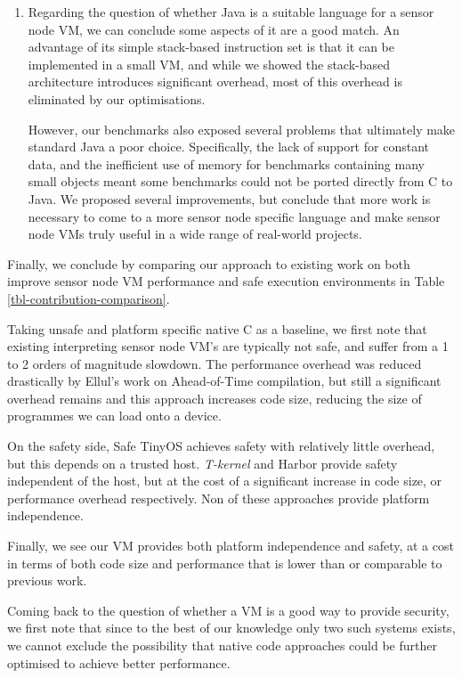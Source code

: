 \begin{enumerate}
	\item
	Regarding the question of whether Java is a suitable language for a sensor node VM, we can conclude some aspects of it are a good match. An advantage of its simple stack-based instruction set is that it can be implemented in a small VM, and while we showed the stack-based architecture introduces significant overhead, most of this overhead is eliminated by our optimisations.
	
	However, our benchmarks also exposed several problems that ultimately make standard Java a poor choice. Specifically, the lack of support for constant data, and the inefficient use of memory for benchmarks containing many small objects meant some benchmarks could not be ported directly from C to Java. We proposed several improvements, but conclude that more work is necessary to come to a more sensor node specific language and make sensor node VMs truly useful in a wide range of real-world projects.
\end{enumerate}



Finally, we conclude by comparing our approach to existing work on both improve sensor node VM performance and safe execution environments in Table \ref{tbl-contribution-comparison}.

Taking unsafe and platform specific native C as a baseline, we first note that existing interpreting sensor node VM's are typically not safe, and suffer from a 1 to 2 orders of magnitude slowdown. The performance overhead was reduced drastically by Ellul's work on Ahead-of-Time compilation, but still a significant overhead remains and this approach increases code size, reducing the size of programmes we can load onto a device.

On the safety side, Safe TinyOS achieves safety with relatively little overhead, but this depends on a trusted host. \emph{T-kernel} and Harbor provide safety independent of the host, but at the cost of a significant increase in code size, or performance overhead respectively. Non of these approaches provide platform independence.

Finally, we see our VM provides both platform independence and safety, at a cost in terms of both code size and performance that is lower than or comparable to previous work.

Coming back to the question of whether a VM is a good way to provide security, we first note that since to the best of our knowledge only two such systems exists, we cannot exclude the possibility that native code approaches could be further optimised to achieve better performance.

